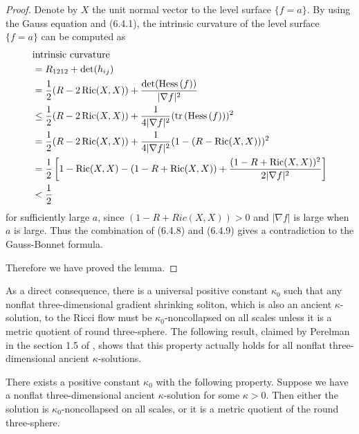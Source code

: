 \begin{proof}
Denote by $X$ the unit normal vector to the level surface
$\{f=a\}$. By using the Gauss equation and (6.4.1), the intrinsic
curvature of the level surface $\{f=a\}$ can be computed as
\begin{align}
&\text{intrinsic curvature} \\
&  = R_{1212}+\det(h_{ij})  \nonumber\\
&  = \frac{1}{2}(R-2\operatorname{Ric}(X,X))
+\frac{\det({\rm Hess}\,(f))}{|\nabla f|^2} \nonumber\\
&  \le \frac{1}{2}(R-2\operatorname{Ric}(X,X))
+\frac{1}{4|\nabla f|^2}(\operatorname{tr}\,({\rm Hess}\,(f)))^2 \nonumber\\
&  = \frac{1}{2}(R-2\operatorname{Ric}(X,X))
+\frac{1}{4|\nabla f|^2}(1-(R-\operatorname{Ric}(X,X)))^2 \nonumber\\
& =\frac{1}{2}\left[1-\operatorname{Ric}(X,X)-(1-R+\operatorname{Ric}(X,X))
+\frac{(1-R+\operatorname{Ric}(X,X))^2}{2|\nabla f|^2}\right] \nonumber\\
&  < \frac{1}{2} \nonumber
\end{align} %
for sufficiently large $a$, since $(1-R+Ric(X,X))>0$ and $|\nabla
f|$ is large when $a$ is large. Thus the combination of (6.4.8)
and (6.4.9) gives a contradiction to the Gauss-Bonnet formula.

Therefore we have proved the lemma.
\end{proof}

As a direct consequence, there is a universal positive constant
$\kappa_0$ such that any nonflat three-dimensional gradient
shrinking soliton, which is also an ancient $\kappa$-solution, to
the Ricci flow must be $\kappa_0$-noncollapsed on all scales
unless it is a metric quotient of  round three-sphere. The
following result, claimed by Perelman in the section 1.5 of
\cite{P2}, shows that this property actually holds for all nonflat
three-dimensional ancient $\kappa$-solutions.

\begin{proposition}
  \label{prop:cz-ancient-three-dimensional-universal-noncollapsing}
 There exists a positive constant $\kappa_0$ with
the following property. Suppose we have a nonflat
three-dimensional ancient $\kappa$-solution for some $\kappa >0$.
Then either the solution is $\kappa_0$-noncollapsed on all scales,
or it is a metric quotient of the round three-sphere.
\end{proposition}

